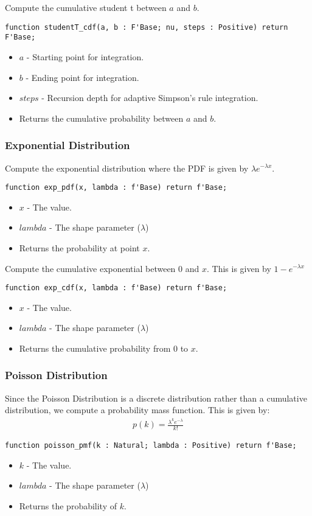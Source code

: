 \documentclass[10pt, openany]{book}
\begin{document}
Compute the cumulative student t between $a$ and $b$.
\begin{lstlisting}
function studentT_cdf(a, b : F'Base; nu, steps : Positive) return F'Base;
\end{lstlisting}
\begin{itemize}
  \item $a$ - Starting point for integration.
  \item $b$ - Ending point for integration.
  \item $steps$ - Recursion depth for adaptive Simpson's rule integration.
  \item Returns the cumulative probability between $a$ and $b$.
\end{itemize}

\subsubsection{Exponential Distribution}
Compute the exponential distribution where the PDF is given by $\lambda e^{-\lambda x}$.
\begin{lstlisting}
function exp_pdf(x, lambda : f'Base) return f'Base;
\end{lstlisting}
\begin{itemize}
  \item $x$ - The value.
  \item $lambda$ - The shape parameter ($\lambda$)
  \item Returns the probability at point $x$.
\end{itemize}

Compute the cumulative exponential between $0$ and $x$.  This is given by $1-e^{-\lambda x}$
\begin{lstlisting}
function exp_cdf(x, lambda : f'Base) return f'Base;
\end{lstlisting}
\begin{itemize}
  \item $x$ - The value.
  \item $lambda$ - The shape parameter ($\lambda$)
  \item Returns the cumulative probability from $0$ to $x$.
\end{itemize}

\subsubsection{Poisson Distribution}
Since the Poisson Distribution is a discrete distribution rather than a cumulative distribution, we compute a probability mass function.  This is given by:
\begin{align*}
  p(k) = \frac{\lambda^k e^{-\lambda}}{k!}
\end{align*}
\begin{lstlisting}
function poisson_pmf(k : Natural; lambda : Positive) return f'Base;
\end{lstlisting}
\begin{itemize}
  \item $k$ - The value.
  \item $lambda$ - The shape parameter ($\lambda$)
  \item Returns the probability of $k$.
\end{itemize}
\end{document}
